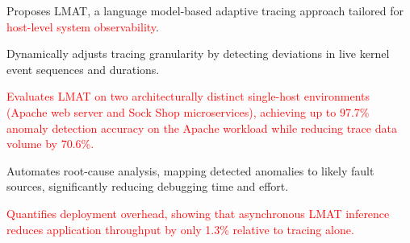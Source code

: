 \documentclass[preprint,12pt]{elsarticle}
\begin{document}
\begin{frontmatter}
\begin{abstract}
Additionally, LMAT utilizes prediction discrepancies to drive an efficient root-cause classifier, mapping detected anomalies directly to their potential fault sources and providing actionable feedback for operations teams. \textcolor{red}{We evaluate LMAT on two architecturally distinct single-host environments---an Apache2 web-server stack and the Sock Shop containerized microservice benchmark---using kernel traces that include standard workloads, duration-centric noise scenarios, and controlled CPU, disk, memory, and network stress injections.} \textcolor{red}{On the Apache workload,} LMAT demonstrates up to \textbf{97.7\%} accuracy in anomaly detection and root-cause identification, surpassing state-of-the-art methods relying solely on event sequences. \textcolor{red}{On Sock Shop, the same design remains effective for host-local change detection, while root-cause attribution in the microservice setting remains more challenging. A deployment-oriented overhead study further shows that asynchronous LMAT inference increases P95 latency by 13.0\% and reduces throughput by 1.3\% relative to tracing alone.} Our findings illustrate that LMAT offers a practical, sustainable, and AI-driven solution for adaptive tracing \textcolor{red}{in the evaluated single-host environments}.
\end{abstract}



\begin{highlights}
\item Proposes LMAT, a language model-based adaptive tracing approach tailored for \textcolor{red}{host-level system observability}.
\item Dynamically adjusts tracing granularity by detecting deviations in live kernel event sequences and durations.
\item \textcolor{red}{Evaluates LMAT on two architecturally distinct single-host environments (Apache web server and Sock Shop microservices), achieving up to 97.7\% anomaly detection accuracy on the Apache workload while reducing trace data volume by 70.6\%.}
\item Automates root-cause analysis, mapping detected anomalies to likely fault sources, significantly reducing debugging time and effort.
\item \textcolor{red}{Quantifies deployment overhead, showing that asynchronous LMAT inference reduces application throughput by only 1.3\% relative to tracing alone.}
\end{highlights}



\end{frontmatter}
\end{document}
